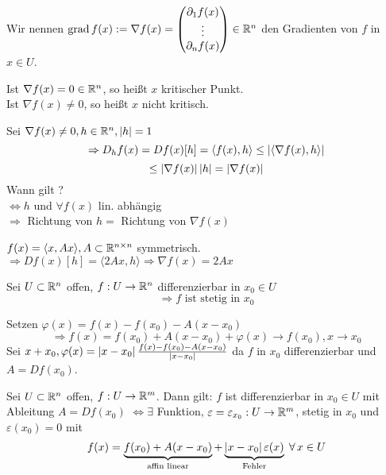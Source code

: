 \documentclass[../ana2.tex]{subfiles}
\begin{document}
\begin{defi}
    Wir nennen \( \operatorname{grad} f(x) := \nabla f(x) = \begin{pmatrix}
        \partial_1 f(x) \\
        \vdots \\
        \partial_n f(x)
    \end{pmatrix} \in \mathbb{R}^n \) den Gradienten von \(f\) in 
    \( x \in U \).

    Ist \( \nabla f(x) = 0 \in \mathbb{R}^n \), so heißt \(x\) 
    kritischer Punkt.\\
    Ist \( \nabla f(x) \neq 0 \), so heißt \(x\) 
    nicht kritisch.
\end{defi}
Sei \( \nabla f(x) \neq 0, h \in \mathbb{R}^n, \left|h\right| = 1 \)
\[ \Rightarrow D_hf(x) = Df(x)[h] = \langle f(x), h \rangle 
\leq \left|\langle \nabla f(x), h \rangle\right| \]
\[ \leq \left|\nabla f(x)\right| \left|h\right| = \left|\nabla f(x)\right| \]
Wann gilt \gqq{\(=\)}?\\
\( \Leftrightarrow h \) und \( \forall f(x) \) lin. abhängig \\
\( \Rightarrow \) Richtung von \(h = \) Richtung von 
\( \nabla f(x) \)
\begin{bsp}
    \( f(x) = \langle x, Ax \rangle, A \subset \mathbb{R}^{n \times n} \)
    symmetrisch. \\
    \( \Rightarrow Df(x)[h] = \langle 2Ax, h \rangle
    \Rightarrow \nabla f(x) = 2Ax \)
\end{bsp}
\begin{satz}
    Sei \(U \subset \mathbb{R}^n\) offen, \( f:U\rightarrow \mathbb{R}^n \)
    differenzierbar in \( x_0 \in U \)
    \[ \Rightarrow f \text{ ist stetig in } x_0 \]
\end{satz}
\begin{bew}
    Setzen \( \varphi(x) = f(x) - f(x_0) - A(x - x_0) \)
    \[ \Rightarrow f(x) 
    = f(x_0) + A(x - x_0) + \varphi(x) \rightarrow f(x_0), 
    x\rightarrow x_0 \]
    Sei \( x + x_0, \varphi(x) = 
    \left|x - x_0\right| \frac{f(x) - f(x_0) - A(x - x_0)}{\left|x - x_0\right|} \)
    da \( f \) in \(x_0\) differenzierbar und \(A = D f(x_0)\).
\end{bew}
\begin{lem}
    Sei \( U \subset \mathbb{R}^n\) offen, \(f:U\rightarrow \mathbb{R}^m\).
    Dann gilt:
    \(f\) ist differenzierbar in \(x_0 \in U \) mit Ableitung
    \( A = Df(x_0) \)
    \( \Leftrightarrow \exists \) Funktion, \( \varepsilon = 
    \varepsilon_{x_0}:U\rightarrow \mathbb{R}^m \), stetig in \(x_0\) und
    \(\varepsilon(x_0) = 0\) mit 
    \[ f(x) = \underbrace{f(x_0) + A(x-x_0)}_{\text{affin linear}} 
    + \underbrace{\abs{x-x_0}\varepsilon(x)}_{\text{Fehler}}
    \; \forall x \in U \]
\end{lem}
\end{document}
